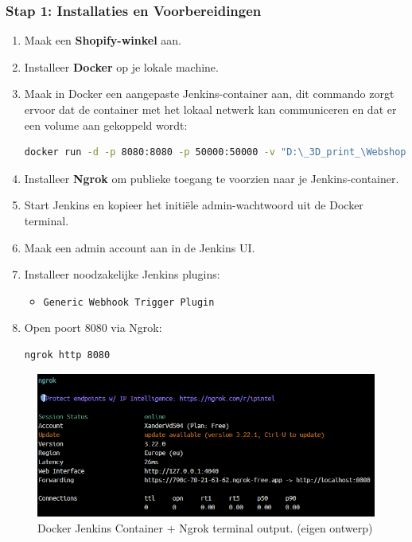 \subsubsection{Stap 1: Installaties en Voorbereidingen}
\begin{enumerate}
    \item Maak een \textbf{Shopify-winkel} aan.
    \item Installeer \textbf{Docker} op je lokale machine.
    \item Maak in Docker een aangepaste Jenkins-container aan, dit commando zorgt ervoor dat de container met het lokaal netwerk kan communiceren en dat er een volume aan gekoppeld  wordt:
    \begin{lstlisting}[language=bash, caption=Docker commando voor Jenkins met volume en poorten]
        docker run -d -p 8080:8080 -p 50000:50000 -v "D:\_3D_print_\Webshop:/var/jenkins_home" --name jenkins-met-backup jenkins-met-wijzigingen:custom
    \end{lstlisting}
    \item Installeer \textbf{Ngrok} om publieke toegang te voorzien naar je Jenkins-container.
    \item Start Jenkins en kopieer het initiële admin-wachtwoord uit de Docker terminal.
    \item Maak een admin account aan in de Jenkins UI.
    
    \item Installeer noodzakelijke Jenkins plugins:
    \begin{itemize}
        \item \texttt{Generic Webhook Trigger Plugin}
    \end{itemize}
    \item Open poort 8080 via Ngrok:
    \begin{lstlisting}[language=bash]
        ngrok http 8080
    \end{lstlisting}

\end{enumerate}

\vspace{0.5em}
\begin{figure}[H]
    \centering
    \includegraphics[width=1\linewidth]{foto's/ngrokWithJenkins.png}
    \caption{Docker Jenkins Container + Ngrok terminal output. (eigen ontwerp)}
    \label{fig:Ngrok-terminal}
\end{figure}

